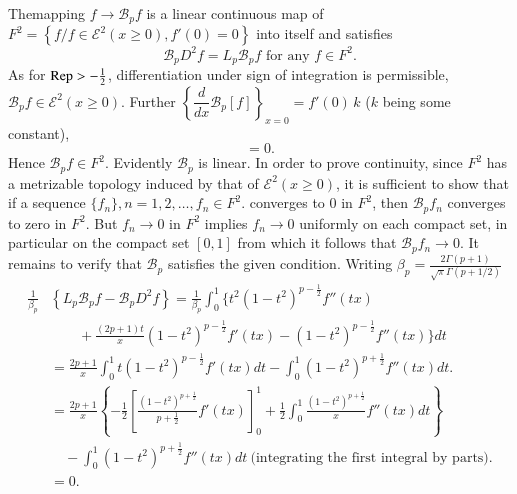 \setcounter{proposition}{0}
\begin{proposition}\label{part1:chap3:sec1:prop1}%
  The\pageoriginale mapping $f \to \mathscr{B}_p f$ is a linear continuous map of
  $F^2 = \left\{ f / f \in \mathscr{E}^2 ( x \geq 0),  f ' (0) = 0
  \right\}$ into itself and satisfies  
  $$
  \mathscr{B} _p D^2 f = L_p \mathscr{B} _p f  \text{ for any  } f \in F^2. 
  $$
  As for $\operatorname{Rep}> - \frac{1}{2}$, differentiation under sign of
  integration is permissible, $\mathscr{B}_p f \in \mathscr{E}^2 (x
  \geq 0)$. Further $\left\{ \dfrac{d}{dx} \mathscr{B}_p [f]\right\}_{
    x = 0} = f' (0)\, k$ ($k$ being some constant),  
  $$
  = 0. 
  $$
  Hence $\mathscr{B} _p f \in F^2 $. Evidently $\mathscr{B}_p$ is
  linear.  In order to prove continuity, since $F^2$ has a metrizable
  topology induced by that of $\mathscr{E}^2 (x\geq 0) $, it is
  sufficient to show that if a sequence $\{f_n \}, n = 1, 2, \ldots,
  f_n \in F^2$. converges to $0$ in $F^2$, then $\mathscr{B}_p f_n$
  converges to zero in $F^2$. But $f_n \to 0$  in $F^2$ implies $f_n
  \to 0$ uniformly on each compact set, in particular on the compact
  set $[ 0, 1]$ from which it follows that  $\mathscr{B}_p f _n \to
  0$. It remains to verify that $\mathscr{B}_p$ satisfies the given
  condition. Writing $\beta _p = \frac{2 \Gamma ( p +1) }{\sqrt{\pi}
    \Gamma \left(p + 1/2 \right)} $ 
  \begin{align*}
  \frac{1}{\beta_p} & \left \{ L_p \mathscr{B} _p f - \mathscr{B} _p D^2
  f \right \} = \frac{1}{\beta _p} \int_0^1 \bigg \{ t^2 (1 - t ^2 )^{
    p - \frac{1}{2}} f'' (tx) \\
    & \qquad + \frac{(2 p + 1)t}{x} (1 - t^2 )^{p - \frac{1}{2}} f' (tx) - (1
    - t^2) ^{p -\frac{1}{2}} f'' (tx)\big\}  dt \\ 
    & = \frac{2 p + 1}{x} \int^1 _0 t (1 - t^2) ^{ p - \frac{1}{2}} f'
    (tx) dt - \int_0^1 (1 - t^2 )^{p + \frac{1}{2}} f'' (tx) dt.\\ 
    & = \frac{2 p + 1}{x} \left\{- \frac{1}{2} \left[ \frac{(1 -
        t^2)^{ p + \frac{1}{2}}}{p + \frac{1}{2}} f' (tx) \right]^1_0
    + \frac{1}{2} \int^1_0 \frac{(1-t^2)^{p + \frac{1}{2}}}  x f''
    (tx)dt \right\}\\  
    & \quad - \int^1_0 (1 - t^2 )^{ p + \frac{1}{2}} f'' (tx)
    dt  ~\text{(integrating the first integral by parts)}.\\
    & = 0.
  \end{align*}
\end{proposition} 

